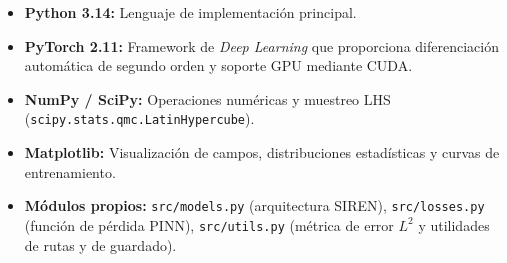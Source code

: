\begin{itemize}
    \item \textbf{Python 3.14:} Lenguaje de implementación principal.
    \item \textbf{PyTorch 2.11:} Framework de \textit{Deep Learning} que
    proporciona diferenciación automática de segundo orden y soporte GPU
    mediante CUDA.
    \item \textbf{NumPy / SciPy:} Operaciones numéricas y muestreo LHS
    (\texttt{scipy.stats.qmc.LatinHypercube}).
    \item \textbf{Matplotlib:} Visualización de campos, distribuciones
    estadísticas y curvas de entrenamiento.
    \item \textbf{Módulos propios:} \texttt{src/models.py} (arquitectura SIREN),
    \texttt{src/losses.py} (función de pérdida PINN), \texttt{src/utils.py}
    (métrica de error $L^2$ y utilidades de rutas y de guardado).
\end{itemize}
